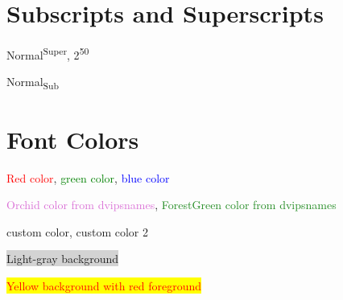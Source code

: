 \documentclass{article}
\begin{document}
\section{Subscripts and Superscripts}


Normal\textsuperscript{Super}, 2\textsuperscript{50}

Normal\textsubscript{Sub}



\section{Font Colors}


\textcolor{red}{Red color}, \textcolor{green}{green color}, \textcolor{blue}{blue color}

\textcolor{Orchid}{Orchid color from dvipsnames}, \textcolor{ForestGreen}{ForestGreen color from dvipsnames}

\textcolor{MyColor}{custom color}, \textcolor{MyColor2}{custom color 2}

\colorbox{lightgray}{Light-gray background}

\colorbox{yellow}{\textcolor{red}{Yellow background with red foreground}}
\end{document}
